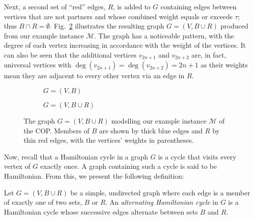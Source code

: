 \documentclass[a4paper,11pt,authoryear]{elsarticle}
\begin{document}
Next, a second set of ``red'' edges, $R$, is added to $G$ containing edges between vertices that are not partners and whose combined weight equals or exceeds $\tau$; thus $B \cap R = \emptyset$. Fig.~\ref{fig:threshold1} illustrates the resulting graph $G = (V, B \cup R)$ produced from our example instance $\mathcal{M}$. The graph has a noticeable pattern, with the degree of each vertex increasing in accordance with the weight of the vertices. It can also be seen that the additional vertices $v_{2n+1}$ and $v_{2n+2}$ are, in fact, universal vertices with $\deg(v_{2n+1}) = \deg(v_{2n+2}) = 2n+1$ as their weights mean they are adjacent to every other vertex via an edge in $R$.


\begin{figure}[h!]	
	\centering
	\begin{subfigure}[b]{0.4\textwidth}
		
		\caption{$G = (V, B)$}
		\label{fig:partners}
	\end{subfigure} \hspace{5mm}
	\begin{subfigure}[b]{0.4\textwidth}
		
		\caption{$G = (V, B \cup R)$}
		\label{fig:threshold1}
	\end{subfigure} %
	\caption{The graph $G=(V, B \cup R)$ modelling our example instance $\mathcal{M}$ of the COP. Members of $B$ are shown by thick blue edges and $R$ by thin red edges, with the vertices' weights in parentheses.}
	\label{fig:model}
\end{figure}


\noindent Now, recall that a Hamiltonian cycle in a graph $G$ is a cycle that visits every vertex of $G$ exactly once. A graph containing such a cycle is said to be Hamiltonian. From this, we present the following definition:

\begin{definition} %
	Let $G = (V, B \cup R)$ be a simple, undirected graph where each edge is a member of exactly one of two sets, $B$ or $R$. An \emph{alternating Hamiltonian cycle} in $G$ is a Hamiltonian cycle whose successive edges alternate between sets $B$ and $R$.
	\label{defn:althamcycle}
\end{definition}
\end{document}
